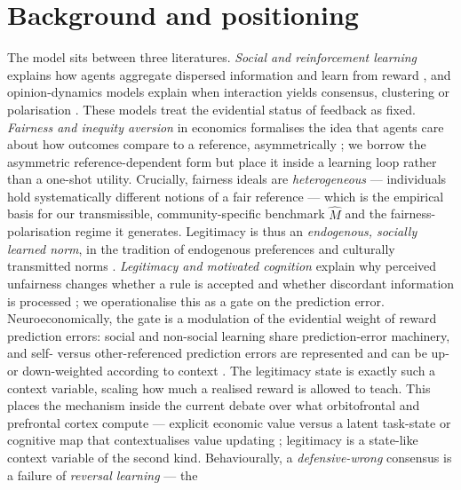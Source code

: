 \documentclass[11pt]{article}
\newcommand{\1}{\mathbf{1}}
\begin{document}
\section{Background and positioning}
\label{sec:background}
The model sits between three literatures. \emph{Social and reinforcement
learning} explains how agents aggregate dispersed information and learn from
reward \citep{DeGroot1974,GolubJackson2010,SuttonBarto2018}, and opinion-dynamics
models explain when interaction yields consensus, clustering or polarisation
\citep{HegselmannKrause2002,FlacheMasEtAl2017}. These models treat the evidential
status of feedback as fixed. \emph{Fairness and inequity aversion} in economics
formalises the idea that agents care about how outcomes compare to a reference,
asymmetrically \citep{Rabin1993Fairness,FehrSchmidt1999,BoltonOckenfels2000,CharnessRabin2002};
we borrow the asymmetric reference-dependent form but place it inside a learning
loop rather than a one-shot utility. Crucially, fairness ideals are
\emph{heterogeneous} --- individuals hold systematically different notions of a
fair reference \citep{CappelenHoleSorensenTungodden2007,Andre2024ShallowMeritocracy}
--- which is the empirical basis for our transmissible, community-specific
benchmark $\hat M$ and the fairness-polarisation regime it generates. Legitimacy
is thus an \emph{endogenous, socially learned norm}, in the tradition of
endogenous preferences and culturally transmitted norms
\citep{Bowles1998,Tyler2006}. \emph{Legitimacy and motivated cognition}
explain why perceived unfairness changes whether a rule is accepted and whether
discordant information is processed \citep{Tyler2006,Kunda1990,Festinger1957}; we
operationalise this as a gate on the prediction error. Neuroeconomically, the gate
is a modulation of the evidential weight of reward prediction errors: social and
non-social learning share prediction-error machinery, and self- versus
other-referenced prediction errors are represented and can be up- or
down-weighted according to context \citep{JoinerPivaTurrinChang2017}. The
legitimacy state is exactly such a context variable, scaling how much a realised
reward is allowed to teach. This places the mechanism inside the current debate
over what orbitofrontal and prefrontal cortex compute --- explicit economic value
\citep{PadoaSchioppaConen2017} versus a latent task-state or cognitive map that
contextualises value updating \citep{HaydenNiv2021}; legitimacy is a
state-like context variable of the second kind. Behaviourally, a
\emph{defensive-wrong} consensus is a failure of \emph{reversal learning} --- the
\end{document}
